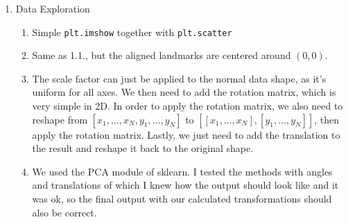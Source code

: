 \documentclass[
    a4paper,
    12pt,
    parskip=half,
]{scrarticle}
\begin{document}
\begin{enumerate}
    \item Data Exploration
    \begin{enumerate}[label=\theenumi.\arabic*.]
        \item Simple \texttt{plt.imshow} together with \texttt{plt.scatter}
        \item Same as 1.1., but the aligned landmarks are centered around \((0, 0)\).
        \item The scale factor can just be applied to the normal data shape, as it's uniform for all axes.
        We then need to add the rotation matrix, which is very simple in 2D. In order to apply the rotation matrix,
        we also need to reshape from \([x_1, \ldots , x_N, y_1, \ldots, y_N]\) to \([[x_1, \ldots, x_N], [y_1, \ldots, y_N]]\), then apply
        the rotation matrix. Lastly, we just need to add the translation to the result and reshape it back to the original shape.
        \item We used the PCA module of sklearn.
        I tested the methods with angles and translations of which I knew how the output should look like and it was ok,
        so the final output with our calculated transformations should also be correct.
    \end{enumerate}


\end{enumerate}
\end{document}
